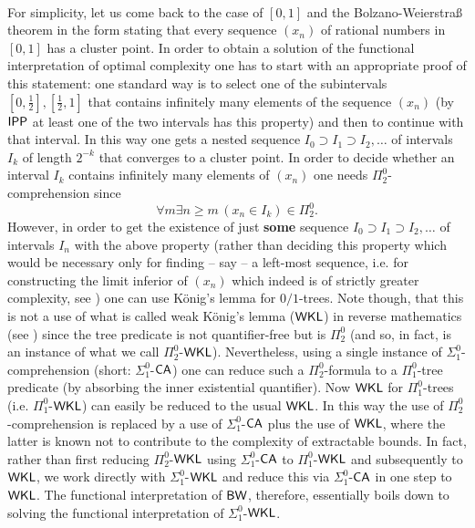 \\[1mm] For simplicity, let us come back to the case of $[0,1]$ and the 
Bolzano-Weierstra\ss{} theorem in the form stating that every sequence 
$(x_n)$ of rational numbers 
in $[0,1]$ has a cluster point. In order to obtain a solution of the 
functional interpretation of optimal complexity one has to start with an 
appropriate proof of this statement: one standard way is to select one of 
the subintervals $[0,\frac{1}{2}],[\frac{1}{2},1]$ that contains infinitely 
many elements of the sequence $(x_n)$ (by $\textsf{\upshape IPP}$ at least one of the two 
intervals has this property) and then to continue with that interval. In 
this way one gets a nested sequence $I_0\supset I_1\supset I_2,\ldots$ 
of intervals $I_k$ of length $2^{-k}$ that converges to a cluster point. 
In order to decide whether an interval $I_k$ contains infinitely 
many elements of $(x_n)$ one needs $\Pi^0_2$-comprehension since 
\[ \forall m\exists n\ge m\, (x_n\in I_k) \in\Pi^0_2. \]
However, in order to get the existence of just {\bf some} 
sequence $I_0\supset I_1\supset I_2,\ldots$ 
of intervals $I_n$ with the above property (rather than deciding 
this property which would be necessary only for finding -- say -- 
a left-most sequence, i.e. for constructing the limit inferior of $(x_n)$ 
which indeed is of strictly greater complexity, see \cite{Kohlenbach00}) 
one can use K\"onig's lemma for 
$0/1$-trees. Note though, that 
this is not a use of what is called weak K\"onig's 
lemma ($\textsf{\upshape WKL}$) in reverse mathematics (see \cite{Simpson99}) since the tree 
predicate is not quantifier-free but is $\Pi^0_2$ (and so, in fact, is 
an instance of what we call $\Pi^0_2$-$\textsf{\upshape WKL}$). Nevertheless, using 
a single instance of $\Sigma^0_1$-comprehension (short: $\Sigma^0_1$-$\textsf{\upshape CA}$) 
one can reduce such a 
$\Pi^0_2$-formula to a $\Pi^0_1$-tree predicate (by absorbing the inner 
existential quantifier). Now $\textsf{\upshape WKL}$ for $\Pi^0_1$-trees (i.e. 
$\Pi^0_1$-$\textsf{\upshape WKL}$) 
can easily be reduced to 
the usual $\textsf{\upshape WKL}$. In this way the use of $\Pi^0_2$-comprehension is replaced 
by a use of $\Sigma^0_1$-$\textsf{\upshape CA}$ plus the use of $\textsf{\upshape WKL}$, where the latter is 
known not to contribute to the complexity of extractable bounds. In fact, 
rather than first reducing $\Pi^0_2$-$\textsf{\upshape WKL}$ using $\Sigma^0_1$-$\textsf{\upshape CA}$ to 
$\Pi^0_1$-$\textsf{\upshape WKL}$ and subsequently to $\textsf{\upshape WKL}$, we work directly with 
$\Sigma^0_1$-$\textsf{\upshape WKL}$ 
and reduce this via $\Sigma^0_1$-$\textsf{\upshape CA}$ in one step to $\textsf{\upshape WKL}$. The functional 
interpretation of $\textsf{\upshape BW}$, therefore, essentially boils down to solving the 
functional interpretation of $\Sigma^0_1$-$\textsf{\upshape WKL}$.  


